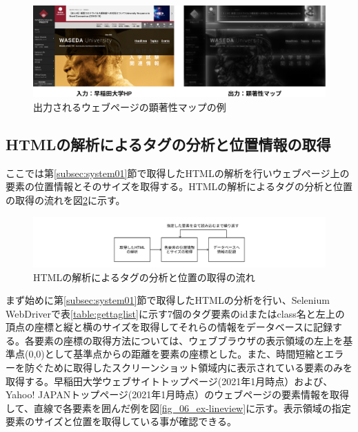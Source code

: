 \begin{figure}[H]
  \centering
  \includegraphics[width=12cm]{figures/06_ex-saliencymap}
  \caption{出力されるウェブページの顕著性マップの例}
  \label{fig_06_example_saliencymap}
\end{figure}


\subsection{HTMLの解析によるタグの分析と位置情報の取得}\label{subsec:system02}
\par ここでは第\ref{subsec:system01}節で取得したHTMLの解析を行いウェブページ上の要素の位置情報とそのサイズを取得する。HTMLの解析によるタグの分析と位置の取得の流れを図\ref{fig_system02}に示す。

\begin{figure}[H]
    \centering
    \includegraphics[width=12cm]{figures/06_process02.jpg}
    \caption{HTMLの解析によるタグの分析と位置の取得の流れ}
    \label{fig_system02}
\end{figure}

\par まず始めに第\ref{subsec:system01}節で取得したHTMLの分析を行い、Selenium WebDriverで表\ref{table:gettaglist}に示す7個のタグ要素のidまたはclass名と左上の頂点の座標と縦と横のサイズを取得してそれらの情報をデータベースに記録する。各要素の座標の取得方法については、ウェブブラウザの表示領域の左上を基準点(0,0)として基準点からの距離を要素の座標とした。また、時間短縮とエラーを防ぐために取得したスクリーンショット領域内に表示されている要素のみを取得する。早稲田大学ウェブサイトトップページ(2021年1月時点）\cite{waseda_top}および、Yahoo! JAPANトップページ(2021年1月時点）\cite{yahoo}のウェブページの要素情報を取得して、直線で各要素を囲んだ例を図\ref{fig_06_ex-lineview}に示す。表示領域の指定要素のサイズと位置を取得している事が確認できる。

